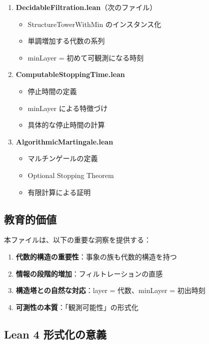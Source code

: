 \documentclass[12pt,a4paper,ja=standard]{bxjsarticle}
\theoremstyle{definition}
\begin{document}
\begin{enumerate}
    \item \textbf{DecidableFiltration.lean}（次のファイル）
    \begin{itemize}
        \item StructureTowerWithMin のインスタンス化
        \item 単調増加する代数の系列
        \item minLayer = 初めて可観測になる時刻
    \end{itemize}
    
    \item \textbf{ComputableStoppingTime.lean}
    \begin{itemize}
        \item 停止時間の定義
        \item minLayer による特徴づけ
        \item 具体的な停止時間の計算
    \end{itemize}
    
    \item \textbf{AlgorithmicMartingale.lean}
    \begin{itemize}
        \item マルチンゲールの定義
        \item Optional Stopping Theorem
        \item 有限計算による証明
    \end{itemize}
\end{enumerate}

\subsection{教育的価値}

\begin{keypoint}
本ファイルは、以下の重要な洞察を提供する：

\begin{enumerate}
    \item \textbf{代数的構造の重要性}：事象の族も代数的構造を持つ
    \item \textbf{情報の段階的増加}：フィルトレーションの直感
    \item \textbf{構造塔との自然な対応}：layer = 代数、minLayer = 初出時刻
    \item \textbf{可測性の本質}：「観測可能性」の形式化
\end{enumerate}
\end{keypoint}

\subsection{Lean 4 形式化の意義}
\end{document}
